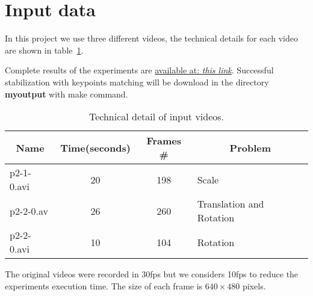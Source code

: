 \section{Input data}

In this project we use three different videos, the technical details for each video are shown in table~\ref{table:input}.

Complete results of the experiments are \href{https://drive.google.com/open?id=0Bx_3lNzg57uuelRFc2JGWjR5ZkE}{available at: \textit{this link}}. Successful stabilization with keypoints matching will be download in the directory \textbf{myoutput} with make command.
\begin{table}[H]
\centering
\begin{tabular}{|l|c|c|l|}
\hline
\multicolumn{1}{|c|}{\textbf{Name}} & \textbf{Time(seconds)} & \textbf{Frames \#} & \multicolumn{1}{c|}{\textbf{Problem}} \\ \hline
p2-1-0.avi & 20 & 198 & Scale \\ \hline
p2-2-0.av & 26 & 260 & Translation and Rotation \\ \hline
p2-2-0.avi & 10 & 104 & Rotation \\ \hline
\end{tabular}
\caption{Technical detail of input videos.}
\label{table:input}
\end{table}

The original videos were recorded in 30fps but we considers 10fps to reduce the experiments execution time. The size of each frame is $640\times 480$ pixels.
